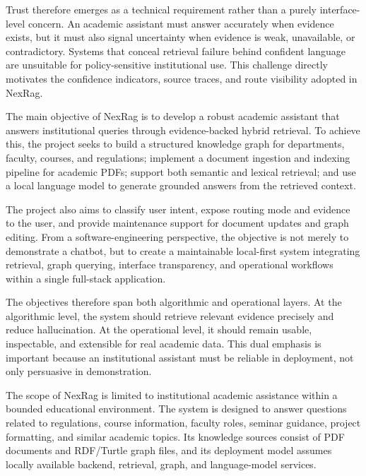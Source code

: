 Trust therefore emerges as a technical requirement rather than a purely interface-level concern. An academic assistant must answer accurately when evidence exists, but it must also signal uncertainty when evidence is weak, unavailable, or contradictory. Systems that conceal retrieval failure behind confident language are unsuitable for policy-sensitive institutional use. This challenge directly motivates the confidence indicators, source traces, and route visibility adopted in NexRag.

\label{sec:introduction-objectives}

The main objective of NexRag is to develop a robust academic assistant that answers institutional queries through evidence-backed hybrid retrieval. To achieve this, the project seeks to build a structured knowledge graph for departments, faculty, courses, and regulations; implement a document ingestion and indexing pipeline for academic PDFs; support both semantic and lexical retrieval; and use a local language model to generate grounded answers from the retrieved context.

The project also aims to classify user intent, expose routing mode and evidence to the user, and provide maintenance support for document updates and graph editing. From a software-engineering perspective, the objective is not merely to demonstrate a chatbot, but to create a maintainable local-first system integrating retrieval, graph querying, interface transparency, and operational workflows within a single full-stack application.

The objectives therefore span both algorithmic and operational layers. At the algorithmic level, the system should retrieve relevant evidence precisely and reduce hallucination. At the operational level, it should remain usable, inspectable, and extensible for real academic data. This dual emphasis is important because an institutional assistant must be reliable in deployment, not only persuasive in demonstration.

\label{sec:introduction-scope}

The scope of NexRag is limited to institutional academic assistance within a bounded educational environment. The system is designed to answer questions related to regulations, course information, faculty roles, seminar guidance, project formatting, and similar academic topics. Its knowledge sources consist of PDF documents and RDF/Turtle graph files, and its deployment model assumes locally available backend, retrieval, graph, and language-model services.

